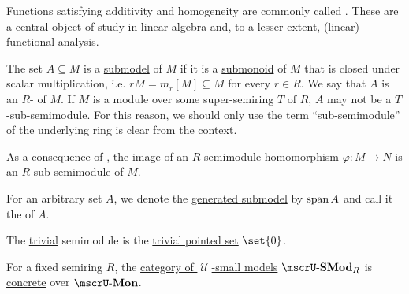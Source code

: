 \begin{definition}
\begin{thmenum}[resume=def:semimodule]
    Functions satisfying additivity and homogeneity are commonly called . These are a central object of study in \hyperref[sec:linear_algebra]{linear algebra} and, to a lesser extent, (linear) \hyperref[sec:functional_analysis]{functional analysis}.

     The set \( A \subseteq M \) is a \hyperref[thm:substructure_is_model]{submodel} of \( M \) if it is a \hyperref[def:monoid/submodel]{submonoid} of \( M \) that is closed under scalar multiplication, i.e. \( rM = m_r[M] \subseteq M \) for every \( r \in R \). We say that \( A \) is an \( R \)- of \( M \). If \( M \) is a module over some super-semiring \( T \) of \( R \), \( A \) may not be a \( T \)-sub-semimodule. For this reason, we should only use the term \enquote{sub-semimodule} of the underlying ring is clear from the context.

    As a consequence of , the \hyperref[def:multi_valued_function/image]{image} of an \( R \)-semimodule homomorphism \( \varphi: M \to N \) is an \( R \)-sub-semimodule of \( M \).

    For an arbitrary set \( A \), we denote the \hyperref[def:first_order_generated_substructure]{generated submodel} by \( \operatorname{span}{ A } \) and call it the  of \( A \).

     The \hyperref[thm:substructures_form_complete_lattice/bottom]{trivial} semimodule is the \hyperref[def:pointed_set/trivial]{trivial pointed set} \( \set{ 0 } \).

     For a fixed semiring \( R \), the \hyperref[def:category_of_small_first_order_models]{category of \( \mscrU \)-small models} \( \ucat{SMod}_R \) is \hyperref[def:concrete_category]{concrete} over \hyperref[def:monoid]{\( \ucat{Mon} \)}.
  \end{thmenum}
\end{definition}
